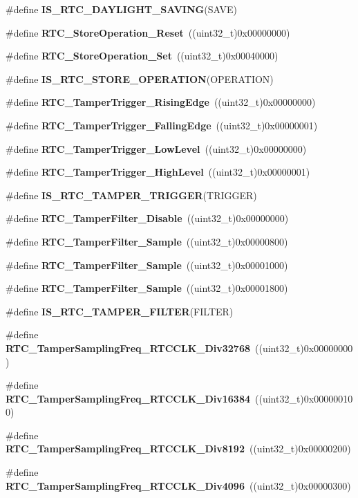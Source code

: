 \begin{DoxyCompactItemize}
\item 
\#define \textbf{ I\+S\+\_\+\+R\+T\+C\+\_\+\+D\+A\+Y\+L\+I\+G\+H\+T\+\_\+\+S\+A\+V\+I\+NG}(S\+A\+VE)
\item 
\#define \textbf{ R\+T\+C\+\_\+\+Store\+Operation\+\_\+\+Reset}~((uint32\+\_\+t)0x00000000)
\item 
\#define \textbf{ R\+T\+C\+\_\+\+Store\+Operation\+\_\+\+Set}~((uint32\+\_\+t)0x00040000)
\item 
\#define \textbf{ I\+S\+\_\+\+R\+T\+C\+\_\+\+S\+T\+O\+R\+E\+\_\+\+O\+P\+E\+R\+A\+T\+I\+ON}(O\+P\+E\+R\+A\+T\+I\+ON)
\item 
\#define \textbf{ R\+T\+C\+\_\+\+Tamper\+Trigger\+\_\+\+Rising\+Edge}~((uint32\+\_\+t)0x00000000)
\item 
\#define \textbf{ R\+T\+C\+\_\+\+Tamper\+Trigger\+\_\+\+Falling\+Edge}~((uint32\+\_\+t)0x00000001)
\item 
\#define \textbf{ R\+T\+C\+\_\+\+Tamper\+Trigger\+\_\+\+Low\+Level}~((uint32\+\_\+t)0x00000000)
\item 
\#define \textbf{ R\+T\+C\+\_\+\+Tamper\+Trigger\+\_\+\+High\+Level}~((uint32\+\_\+t)0x00000001)
\item 
\#define \textbf{ I\+S\+\_\+\+R\+T\+C\+\_\+\+T\+A\+M\+P\+E\+R\+\_\+\+T\+R\+I\+G\+G\+ER}(T\+R\+I\+G\+G\+ER)
\item 
\#define \textbf{ R\+T\+C\+\_\+\+Tamper\+Filter\+\_\+\+Disable}~((uint32\+\_\+t)0x00000000)
\item 
\#define \textbf{ R\+T\+C\+\_\+\+Tamper\+Filter\+\_\+Sample}~((uint32\+\_\+t)0x00000800)
\item 
\#define \textbf{ R\+T\+C\+\_\+\+Tamper\+Filter\+\_\+Sample}~((uint32\+\_\+t)0x00001000)
\item 
\#define \textbf{ R\+T\+C\+\_\+\+Tamper\+Filter\+\_\+Sample}~((uint32\+\_\+t)0x00001800)
\item 
\#define \textbf{ I\+S\+\_\+\+R\+T\+C\+\_\+\+T\+A\+M\+P\+E\+R\+\_\+\+F\+I\+L\+T\+ER}(F\+I\+L\+T\+ER)
\item 
\#define \textbf{ R\+T\+C\+\_\+\+Tamper\+Sampling\+Freq\+\_\+\+R\+T\+C\+C\+L\+K\+\_\+\+Div32768}~((uint32\+\_\+t)0x00000000)
\item 
\#define \textbf{ R\+T\+C\+\_\+\+Tamper\+Sampling\+Freq\+\_\+\+R\+T\+C\+C\+L\+K\+\_\+\+Div16384}~((uint32\+\_\+t)0x000000100)
\item 
\#define \textbf{ R\+T\+C\+\_\+\+Tamper\+Sampling\+Freq\+\_\+\+R\+T\+C\+C\+L\+K\+\_\+\+Div8192}~((uint32\+\_\+t)0x00000200)
\item 
\#define \textbf{ R\+T\+C\+\_\+\+Tamper\+Sampling\+Freq\+\_\+\+R\+T\+C\+C\+L\+K\+\_\+\+Div4096}~((uint32\+\_\+t)0x00000300)

\end{DoxyCompactItemize}
